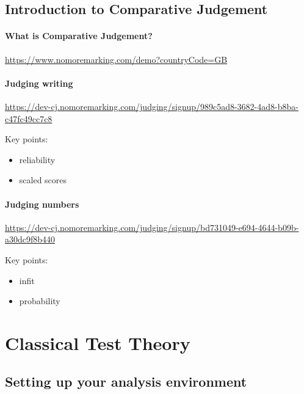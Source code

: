 \documentclass[
  letterpaper,
  DIV=11,
  numbers=noendperiod]{scrreprt}
\providecommand{\tightlist}{%
  \setlength{\itemsep}{0pt}\setlength{\parskip}{0pt}}\usepackage{longtable,booktabs,array}
\begin{document}
\hypertarget{introduction-to-comparative-judgement}{%
\chapter{Introduction to Comparative
Judgement}\label{introduction-to-comparative-judgement}}

\hypertarget{what-is-comparative-judgement}{%
\subsection{What is Comparative
Judgement?}\label{what-is-comparative-judgement}}

\url{https://www.nomoremarking.com/demo?countryCode=GB}

\hypertarget{judging-writing}{%
\subsection{Judging writing}\label{judging-writing}}

\url{https://dev-cj.nomoremarking.com/judging/signup/989c5ad8-3682-4ad8-b8ba-c47fc49cc7c8}

Key points:

\begin{itemize}
\tightlist
\item
  reliability
\item
  scaled scores
\end{itemize}

\hypertarget{judging-numbers}{%
\subsection{Judging numbers}\label{judging-numbers}}

\url{https://dev-cj.nomoremarking.com/judging/signup/bd731049-e694-4644-b09b-a30dc9f8b440}

Key points:

\begin{itemize}
\tightlist
\item
  infit
\item
  probability
\end{itemize}

\part{Classical Test Theory}

\hypertarget{setting-up-your-analysis-environment}{%
\chapter{Setting up your analysis
environment}\label{setting-up-your-analysis-environment}}
\end{document}
